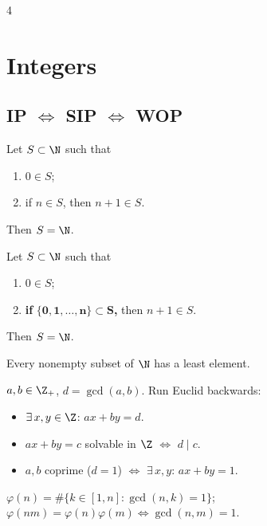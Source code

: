 \documentclass[8pt,a4paper,landscape]{extarticle}
\begin{document}
\begin{multicols*}{4}


\section{Integers}
\subsection{\texorpdfstring{IP $\Leftrightarrow$ SIP $\Leftrightarrow$ WOP}{IP <=> SIP <=> WOP}}

\begin{prop}[title=Induction Principle]
Let $S\subset\N$ such that
\begin{enumerate}
  \item $0\in S$;
  \item if $n\in S$, then $n+1\in S$.
\end{enumerate}
Then $S=\N$.
\end{prop}

\begin{prop}[title=Strong Induction Principle]
Let $S\subset\N$ such that
\begin{enumerate}
  \item $0\in S$;
  \item \textbf{if} $\bm{\{0,1,\ldots,n\}\subset S}$\textbf{,} then $n+1\in S$.
\end{enumerate}
Then $S=\N$.
\end{prop}

\begin{prop}[title=Well-Ordering Principle]
Every nonempty subset of $\N$ has a least element.
\end{prop}

\begin{thm}[title=Bézout]
$a,b\in\Z_+$, $d=\gcd(a,b)$. Run Euclid backwards:
\begin{itemize}
  \item $\exists\,x,y\in\Z$: $ax+by=d$.
  \item $ax+by=c$ solvable in $\Z$ $\iff$ $d\mid c$.
  \item $a,b$ coprime ($d=1$) $\iff$ $\exists\,x,y$: $ax+by=1$.
\end{itemize}
\end{thm}

\begin{defn}[title=Euler's totient $\varphi(n)$]
$\varphi(n)=\#\{k\in[1,n]:\gcd(n,k)=1\}$;\\
$\varphi(nm)=\varphi(n)\varphi(m)\iff\gcd(n,m)=1$.
\end{defn}


\end{multicols*}
\end{document}

